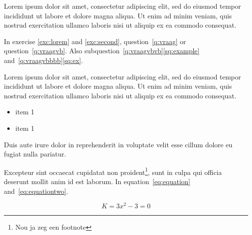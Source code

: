 \documentclass[a4paper,12pt]{extarticle}
\begin{document}
Lorem ipsum dolor sit amet, consectetur adipiscing elit, sed do eiusmod tempor incididunt ut labore et dolore magna aliqua. Ut enim ad minim veniam, quis nostrud exercitation ullamco laboris nisi ut aliquip ex ea commodo consequat. 


 \label{q:vraagvbvbvb}

\clearpage 

 \label{exc:second}

In exercise \ref{exc:lorem} and \ref{exc:second}, question~\ref{q:vraag} or question~\ref{q:vraagvb}. Also subquestion~\ref{q:vraagvbvb}\ref{sq:example} and~\ref{q:vraagvbbbb}\ref{sq:ex}.

Lorem ipsum dolor sit amet, consectetur adipiscing elit, sed do eiusmod tempor incididunt ut labore et dolore magna aliqua. Ut enim ad minim veniam, quis nostrud exercitation ullamco laboris nisi ut aliquip ex ea commodo consequat. 
\begin{itemize}
    \item item 1
    \item item 1
\end{itemize}
Duis aute irure dolor in reprehenderit in voluptate velit esse cillum dolore eu fugiat nulla pariatur. 


Excepteur sint occaecat cupidatat non proident\footnote{Nou ja zeg een footnote}, sunt in culpa qui officia deserunt mollit anim id est laborum. In equation~\ref{eq:equation} and~\ref{eq:equationtwo}.

\begin{equation} \label{eq:equation}
    K=3x^2 - 3 = 0 
\end{equation}
\end{document}
